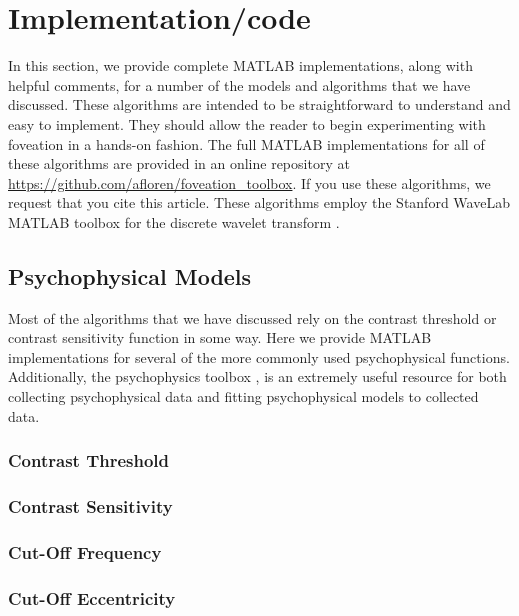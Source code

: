 \documentclass{article}
\begin{document}
\section{Implementation/code}
In this section, we provide complete MATLAB implementations, along with helpful comments, for a number of the models and algorithms that we have discussed.
These algorithms are intended to be straightforward to understand and easy to implement.
They should allow the reader to begin experimenting with foveation in a hands-on fashion.
The full MATLAB implementations for all of these algorithms are provided in an online repository at \url{https://github.com/afloren/foveation_toolbox}.
If you use these algorithms, we request that you cite this article.
These algorithms employ the Stanford WaveLab MATLAB toolbox for the discrete wavelet transform \cite{Buckheit1995}.

\subsection{Psychophysical Models}
Most of the algorithms that we have discussed rely on the contrast threshold or contrast sensitivity function in some way.
Here we provide MATLAB implementations for several of the more commonly used psychophysical functions.
Additionally, the psychophysics toolbox \cite{Brainard1997}, is an extremely useful resource for both collecting psychophysical data and fitting psychophysical models to collected data.

\subsubsection{Contrast Threshold}
%

\subsubsection{Contrast Sensitivity}
%

\subsubsection{Cut-Off Frequency}
%

\subsubsection{Cut-Off Eccentricity}
%
\end{document}

